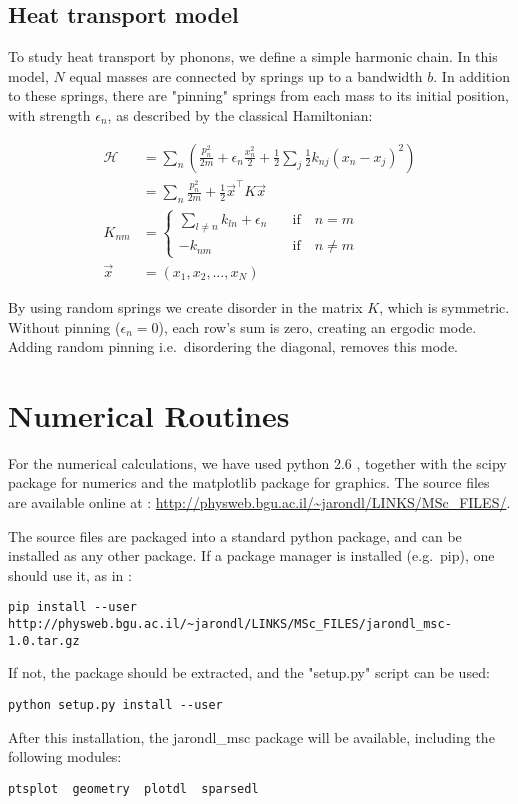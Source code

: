 \section{Heat transport model}

To study heat transport by phonons, we define a simple harmonic chain.
In this model,
$N$ equal masses are connected by springs up to a bandwidth $b$. In addition to these
springs, there are "pinning" springs from each mass to its initial position, with
strength $\epsilon_n$, as described by the classical Hamiltonian:

\begin{align}
\mathcal{H} &= \sum_n \left( \frac{p_n^2}{2m} +\epsilon_n\frac{x_n^2}{2}+ \frac{1}{2}\sum_{j} \frac{1}{2}k_{nj} (x_n-x_j)^2 \right) \\
            &= \sum_{n} \frac{p_n^2}{2m} +  \frac{1}{2}\vec{x}^{\intercal} K \vec{x} \\
            K_{nm} &= \begin{cases} 
            \sum_{l\ne n} k_{ln} +\epsilon_n \quad &\textrm{if}\quad n=m \\ 
            - k_{nm}  \quad &\textrm{if}\quad n\ne m
            \end{cases}\\
            \vec{x} &= (x_1,x_2,\ldots,x_N)
\end{align}

By using random springs we create disorder in the matrix $K$, which
is symmetric. Without pinning ($\epsilon_n=0$), each row's sum is zero,
creating an ergodic mode. Adding random pinning i.e.\ disordering the diagonal,
removes this mode.



\chapter{Numerical Routines}

For the numerical calculations, we have used python 2.6 \cite{guido_van_rossum_python_????}, together
with the scipy \cite{jones_scipy:_2001} package for numerics and the matplotlib \cite{hunter_matplotlib:_2007} package
for graphics. The source files are available online at : 
\url{http://physweb.bgu.ac.il/~jarondl/LINKS/MSc_FILES/}.


The source files are packaged into a standard python package,
and can be installed as any other package. If a package manager is installed (e.g.\ pip),
one should use it, as in :
\begin{verbatim}
pip install --user http://physweb.bgu.ac.il/~jarondl/LINKS/MSc_FILES/jarondl_msc-1.0.tar.gz
\end{verbatim}
If not, the package should be extracted, and the "setup.py" script can be used:
\begin{verbatim}
python setup.py install --user
\end{verbatim}
After this installation, the jarondl\_msc package will be available,
including the following modules:
\begin{verbatim}
ptsplot  geometry  plotdl  sparsedl
\end{verbatim}

